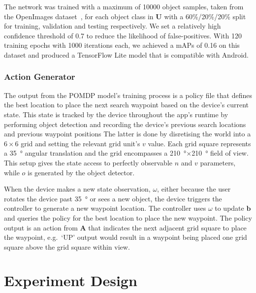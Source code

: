 \documentclass[runningheads]{llncs}
\newcommand\todo[1]{\textcolor{red}{#1}}
\begin{document}
The network was trained with a maximum of 10000 object samples, taken from the OpenImages dataset~\cite{openimages}, for each object class in $\mathbf{U}$ with a 60\%/20\%/20\% split for training, validation and testing respectively.
We set a relatively high confidence threshold of 0.7 to reduce the likelihood of false-positives.
With 120 training epochs with 1000 iterations each, we achieved a mAPs of 0.16 on this dataset and produced a TensorFlow Lite model that is compatible with Android. 

\subsubsection{Action Generator}

The output from the POMDP model's training process is a policy file that defines the best location to place the next search waypoint based on the device's current state.
This state is tracked by the device throughout the app's runtime by performing object detection and recording the device's previous search locations and previous waypoint positions
The latter is done by disretising the world into a $6\times6$ grid and setting the relevant grid unit's $v$ value.
Each grid square represents a \SI{35}{\degree} angular translation and the grid encompasses a \SI{210}{\degree}$\times$\SI{210}{\degree} field of view. 
This setup gives the state access to perfectly observable $n$ and $v$ parameters, while $o$ is generated by the object detector. 

When the device makes a new state observation, $\omega$, either because the user rotates the device past \SI{35}{\degree} or sees a new object, the device triggers the controller to generate a new waypoint location.
The controller uses $\omega$ to update $\mathbf{b}$ and queries the policy for the best location to place the new waypoint. 
The policy output is an action from $\mathbf{A}$ that indicates the next adjacent grid square to place the waypoint, e.g.\ `UP' output would result in a waypoint being placed one grid square above the grid square within view. 

\section{Experiment Design}\label{sec:experiments}
\end{document}
